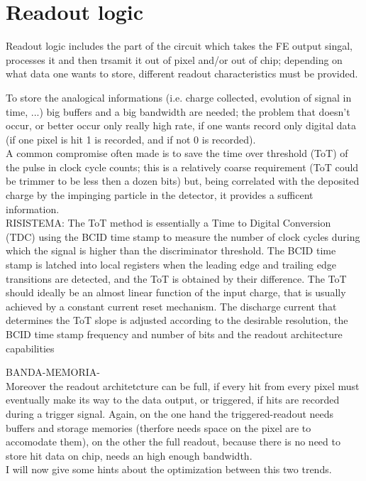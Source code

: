 \section{Readout logic}
   Readout logic includes the part of the circuit which takes the FE output singal, processes it and then trsamit it out of pixel and/or out of chip; depending on what data one wants to store, different readout characteristics must be provided. 

   To store the analogical informations (i.e. charge collected, evolution of signal in time, ...) big buffers and a big bandwidth are needed; the problem that doesn't occur, or better occur only really high rate, if one wants record only digital data (if one pixel is hit 1 is recorded, and if not 0 is recorded).\\
   A common compromise often made is to save the time over threshold (ToT) of the pulse in clock cycle counts; this is a relatively coarse requirement (ToT could be trimmer to be less then a dozen bits) but, being correlated with the deposited charge by the impinging particle in the detector, it provides a sufficent information.\\


   RISISTEMA: 
   The ToT method is essentially a Time to Digital Conversion (TDC) using the BCID
   time stamp to measure the number of clock cycles during which the signal is higher than the
   discriminator threshold. The BCID time stamp is latched into local registers when the leading
   edge and trailing edge transitions are detected, and the ToT is obtained by their difference.
   The ToT should ideally be
   an almost linear function of the input charge, that is usually achieved by a constant current
   reset mechanism. The discharge current that determines the ToT slope is adjusted according to
   the desirable resolution, the BCID time stamp frequency and number of bits and the readout
   architecture capabilities

   BANDA-MEMORIA-\\
   Moreover the readout architetcture can be full, if every hit from every pixel must eventually
   make its way to the data output, or triggered, if hits are recorded during a trigger signal.
   Again, on the one hand the triggered-readout needs buffers and storage memories
   (therfore needs space on the pixel are to accomodate them), on the other the full readout,
   because there is no need to store hit data on chip, needs an high enough bandwidth.\\
   I will now give some hints about the optimization between this two trends.


